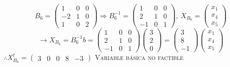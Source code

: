 \begin{itemize}
    $$B_6=\begin{pmatrix}1&0&0\\ -2&1&0\\ 1&0&2\end{pmatrix}\Rightarrow B_6^{-1}=\begin{pmatrix}1&0&0\\ 2&1&0\\ -1&0&1\end{pmatrix},\:X_{B_6}=\begin{pmatrix}x_1\\ x_4\\ x_5\end{pmatrix}$$
    $$\rightarrow X_{B_6}=B_6^{-1}b=\begin{pmatrix}1&0&0\\ 2&1&0\\ -1&0&1\end{pmatrix}\begin{pmatrix}3\\ 2\\ 0\end{pmatrix}=\begin{pmatrix}3\\ 8\\ -1\end{pmatrix}\begin{pmatrix}x_1\\ x_4\\ x_5\end{pmatrix}$$   
    $\therefore X_{B_6}^t=\begin{pmatrix}3&0&0&8&-3\end{pmatrix}$ \textsc{Variable  básica no factible}
    

\end{itemize}
